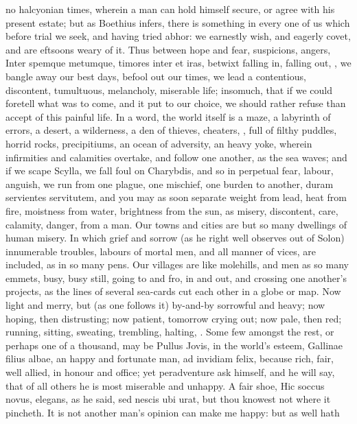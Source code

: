 {no halcyonian times, wherein a man can hold himself secure, or agree
with his present estate; but as Boethius infers, there is
something in every one of us which before trial we seek, and having
tried abhor:  we earnestly wish, and eagerly covet, and are
eftsoons weary of it. Thus between hope and fear, suspicions, angers,
Inter spemque metumque, timores inter et iras, betwixt falling
in, falling out, \etc{}, we bangle away our best days, befool out our
times, we lead a contentious, discontent, tumultuous, melancholy,
miserable life; insomuch, that if we could foretell what was to come,
and it put to our choice, we should rather refuse than accept of this
painful life. In a word, the world itself is a maze, a labyrinth of
errors, a desert, a wilderness, a den of thieves, cheaters, \etc{}, full
of filthy puddles, horrid rocks, precipitiums, an ocean of adversity,
an heavy yoke, wherein infirmities and calamities overtake, and follow
one another, as the sea waves; and if we scape Scylla, we fall foul on
Charybdis, and so in perpetual fear, labour, anguish, we run from one
plague, one mischief, one burden to another, duram servientes
servitutem, and you may as soon separate weight from lead, heat from
fire, moistness from water, brightness from the sun, as misery,
discontent, care, calamity, danger, from a man. Our towns and cities
are but so many dwellings of human misery. In which grief and sorrow
(as he right well observes out of Solon) innumerable troubles,
labours of mortal men, and all manner of vices, are included, as in so
many pens. Our villages are like molehills, and men as so many emmets,
busy, busy still, going to and fro, in and out, and crossing one
another's projects, as the lines of several sea-cards cut each other in
a globe or map. Now light and merry, but (as one follows it)
by-and-by sorrowful and heavy; now hoping, then distrusting; now
patient, tomorrow crying out; now pale, then red; running, sitting,
sweating, trembling, halting, \etc{}. Some few amongst the rest, or perhaps
one of a thousand, may be Pullus Jovis, in the world's esteem, Gallinae
filius albae, an happy and fortunate man, ad invidiam felix, because
rich, fair, well allied, in honour and office; yet peradventure ask
himself, and he will say, that of all others he is most miserable
and unhappy. A fair shoe, Hic soccus novus, elegans, as he said,
sed nescis ubi urat, but thou knowest not where it pincheth. It is not
another man's opinion can make me happy: but as \Seneca well hath
}
